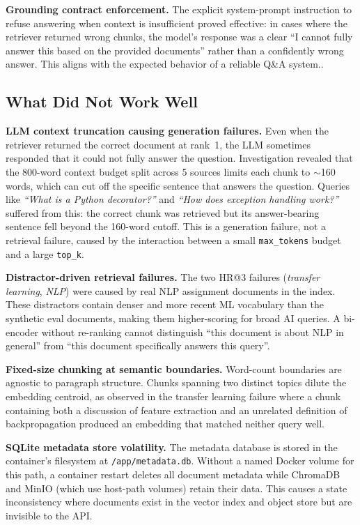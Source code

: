 \documentclass[10pt]{article}
\begin{document}
\textbf{Grounding contract enforcement.}
The explicit system-prompt instruction to refuse answering when context is
insufficient proved effective: in cases where the retriever returned wrong
chunks, the model's response was a clear ``I cannot fully answer this based
on the provided documents'' rather than a confidently wrong answer.
This aligns with the expected behavior of a reliable Q\&A system..

\subsection{What Did Not Work Well}

\textbf{LLM context truncation causing generation failures.}
Even when the retriever returned the correct document at rank~1, the LLM
sometimes responded that it could not fully answer the question.
Investigation revealed that the 800-word context budget split
across 5 sources limits each chunk to $\sim$160 words, which can cut off
the specific sentence that answers the question.
Queries like \textit{``What is a Python decorator?''} and
\textit{``How does exception handling work?''} suffered from this: the correct
chunk was retrieved but its answer-bearing sentence fell beyond the 160-word
cutoff.
This is a generation failure, not a retrieval failure, caused by the
interaction between a small \texttt{max\_tokens} budget and a large
\texttt{top\_k}.

\textbf{Distractor-driven retrieval failures.}
The two HR@3 failures (\textit{transfer learning}, \textit{NLP}) were caused
by real NLP assignment documents in the index.
These distractors contain denser and more recent ML vocabulary than the
synthetic eval documents, making them higher-scoring for broad AI queries.
A bi-encoder without re-ranking cannot distinguish ``this document is about
NLP in general'' from ``this document specifically answers this query''.

\textbf{Fixed-size chunking at semantic boundaries.}
Word-count boundaries are agnostic to paragraph structure.
Chunks spanning two distinct topics dilute the embedding centroid, as
observed in the transfer learning failure where a chunk containing both
a discussion of feature extraction and an unrelated definition of backpropagation
produced an embedding that matched neither query well.

\textbf{SQLite metadata store volatility.}
The metadata database is stored in the container's filesystem at
\texttt{/app/metadata.db}. Without a named Docker volume for this path,
a container restart deletes all document metadata while ChromaDB and MinIO
(which use host-path volumes) retain their data. This causes a state
inconsistency where documents exist in the vector index and object store
but are invisible to the API.
\end{document}
